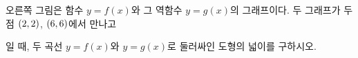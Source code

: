 \noindent\begin{minipage}[t]{0.58\linewidth}\vspace{0pt}\raggedright 오른쪽 그림은 함수 $y=f(x)$와 그 역함수 $y=g(x)$의 그래프이다. 두 그래프가 두 점 $(2{,}\mkern3mu\mathopen{}2)$, $(6{,}\mkern3mu\mathopen{}6)$에서 만나고 \par\smallskip\end{minipage}\hfill\begin{minipage}[t]{0.4\linewidth}\vspace{0pt}\centering \resizebox{\ifdim\width>\linewidth\linewidth\else\width\fi}{!}{}\end{minipage}\par
\noindent {}\par\smallskip\noindent 일 때, 두 곡선 $y=f(x)$와 $y=g(x)$로 둘러싸인 도형의 넓이를 구하시오.
